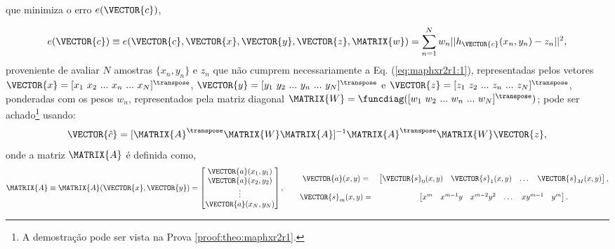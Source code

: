 \begin{theorem}
\begin{minipage}{0.6\textwidth}
que minimiza o erro $e(\VECTOR{c})$,
\end{minipage}
\begin{equation}\label{eq:maphxr2r1:2}
e(\VECTOR{c}) \equiv e(\VECTOR{c},\VECTOR{x},\VECTOR{y},\VECTOR{z},\MATRIX{w})=  \sum_{n=1}^{N} w_n||h_{\VECTOR{c}}(x_n,y_n)-z_n||^2,
\end{equation}
proveniente de avaliar $N$ amostras $\{x_n,y_n\}$ e $z_n$ que não cumprem necessariamente a Eq. (\ref{eq:maphxr2r1:1}), 
representadas pelos vetores 
$\VECTOR{x}=[x_1~ x_2~ ...~ x_n~ ...~ x_N]^{\transpose}$,
$\VECTOR{y}=[y_1~ y_2~ ...~ y_n~ ...~ y_N]^{\transpose}$ e 
$\VECTOR{z}=[z_1~ z_2~ ...~ z_n~ ...~ z_N]^{\transpose}$,
ponderadas com os pesos $w_n$, 
representados pela matriz diagonal $\MATRIX{W}=\funcdiag([w_1~ w_2~ ...~ w_n~ ...~ w_N]^{\transpose})$;
pode ser achado\footnote{A demostração pode ser vista na Prova \ref{proof:theo:maphxr2r1}.} usando:
\begin{equation}\label{eq:maphxr2r1:3}
\VECTOR{\hat{c}}=[\MATRIX{A}^{\transpose}\MATRIX{W}\MATRIX{A}]^{-1}\MATRIX{A}^{\transpose}\MATRIX{W}\VECTOR{z},
\end{equation}
onde a matriz $\MATRIX{A}$ é definida como,
\begin{equation}\label{eq:maphxr2r1:4}
\MATRIX{A}\equiv\MATRIX{A}(\VECTOR{x},\VECTOR{y})=\begin{bmatrix}
\VECTOR{a}(x_1,y_1)\\
\VECTOR{a}(x_2,y_2)\\
\vdots\\
\VECTOR{a}(x_N,y_N)\\
\end{bmatrix}, \qquad
\begin{matrix}
\VECTOR{a}(x,y)= &
\begin{bmatrix}
\VECTOR{s}_{0}(x,y) & \VECTOR{s}_{1}(x,y) &  \dots  & \VECTOR{s}_{M}(x,y)
\end{bmatrix},\\
~&~\\
\VECTOR{s}_{m}(x,y)=&
\begin{bmatrix}
x^m  & x^{m-1} y  & x^{m-2} y^2    & \dots  & x y^{m-1} &  y^m 
\end{bmatrix}.
\end{matrix}
\end{equation}
\end{theorem}


